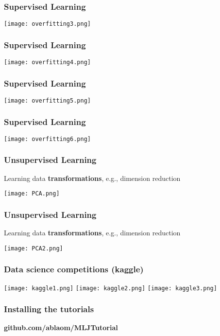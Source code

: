 \documentclass[t]{beamer}
\newcommand\df{\bf\color{Maroon}}
\begin{document}
\begin{frame}
  \frametitle{Supervised Learning}
   \begin{center}
    \texttt{[image: overfitting3.png]}
   \end{center}
\end{frame}

\begin{frame}
  \frametitle{Supervised Learning}
   \begin{center}
    \texttt{[image: overfitting4.png]}
   \end{center}
\end{frame}

\begin{frame}
  \frametitle{Supervised Learning}
   \begin{center}
    \texttt{[image: overfitting5.png]}
   \end{center}
\end{frame}

\begin{frame}
  \frametitle{Supervised Learning}
   \begin{center}
    \texttt{[image: overfitting6.png]}
   \end{center}
\end{frame}

\begin{frame}
  \frametitle{Unsupervised Learning}
  Learning data {\df transformations}, e.g., dimension reduction
   \begin{center}
    \texttt{[image: PCA.png]}
   \end{center}
\end{frame}

\begin{frame}
  \frametitle{Unsupervised Learning}
  Learning data {\df transformations}, e.g., dimension reduction
   \begin{center}
    \texttt{[image: PCA2.png]}
   \end{center}
\end{frame}

\begin{frame}
  \frametitle{Data science competitions (kaggle)}
  \vspace{-1.0\baselineskip}
    \begin{center}
      \texttt{[image: kaggle1.png]}
      \texttt{[image: kaggle2.png]}
      \texttt{[image: kaggle3.png]}
  \end{center}
\end{frame}

\begin{frame}
  \frametitle{Installing the tutorials}
  \vspace{4\baselineskip}
  \begin{center}
    \Large \df github.com/ablaom/MLJTutorial
  \end{center}
\end{frame}


\begin{frame}
        \finalpage
\end{frame}
\end{document}
